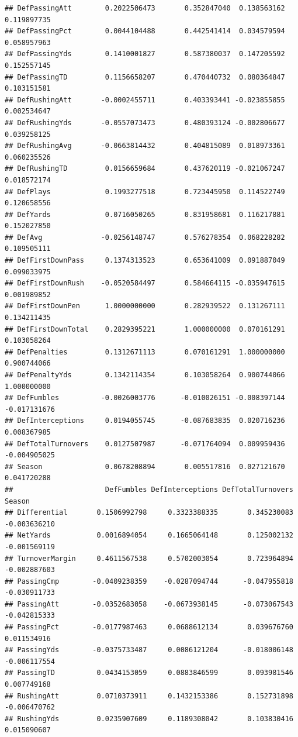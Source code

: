 \documentclass[
]{book}
\begin{document}
\begin{verbatim}
## DefPassingAtt        0.2022506473       0.352847040  0.138563162   0.119897735
## DefPassingPct        0.0044104488       0.442541414  0.034579594   0.058957963
## DefPassingYds        0.1410001827       0.587380037  0.147205592   0.152557145
## DefPassingTD         0.1156658207       0.470440732  0.080364847   0.103151581
## DefRushingAtt       -0.0002455711       0.403393441 -0.023855855   0.002534647
## DefRushingYds       -0.0557073473       0.480393124 -0.002806677   0.039258125
## DefRushingAvg       -0.0663814432       0.404815089  0.018973361   0.060235526
## DefRushingTD         0.0156659684       0.437620119 -0.021067247   0.018572174
## DefPlays             0.1993277518       0.723445950  0.114522749   0.120658556
## DefYards             0.0716050265       0.831958681  0.116217881   0.152027850
## DefAvg              -0.0256148747       0.576278354  0.068228282   0.109505111
## DefFirstDownPass     0.1374313523       0.653641009  0.091887049   0.099033975
## DefFirstDownRush    -0.0520584497       0.584664115 -0.035947615   0.001989852
## DefFirstDownPen      1.0000000000       0.282939522  0.131267111   0.134211435
## DefFirstDownTotal    0.2829395221       1.000000000  0.070161291   0.103058264
## DefPenalties         0.1312671113       0.070161291  1.000000000   0.900744066
## DefPenaltyYds        0.1342114354       0.103058264  0.900744066   1.000000000
## DefFumbles          -0.0026003776      -0.010026151 -0.008397144  -0.017131676
## DefInterceptions     0.0194055745      -0.087683835  0.020716236   0.008367985
## DefTotalTurnovers    0.0127507987      -0.071764094  0.009959436  -0.004905025
## Season               0.0678208894       0.005517816  0.027121670   0.041720288
##                      DefFumbles DefInterceptions DefTotalTurnovers       Season
## Differential       0.1506992798     0.3323388335       0.345230083 -0.003636210
## NetYards           0.0016894054     0.1665064148       0.125002132 -0.001569119
## TurnoverMargin     0.4611567538     0.5702003054       0.723964894 -0.002887603
## PassingCmp        -0.0409238359    -0.0287094744      -0.047955818 -0.030911733
## PassingAtt        -0.0352683058    -0.0673938145      -0.073067543 -0.042815333
## PassingPct        -0.0177987463     0.0688612134       0.039676760  0.011534916
## PassingYds        -0.0375733487     0.0086121204      -0.018006148 -0.006117554
## PassingTD          0.0434153059     0.0883846599       0.093981546  0.007749168
## RushingAtt         0.0710373911     0.1432153386       0.152731898 -0.006470762
## RushingYds         0.0235907609     0.1189308042       0.103830416  0.015090607

\end{verbatim}
\end{document}
